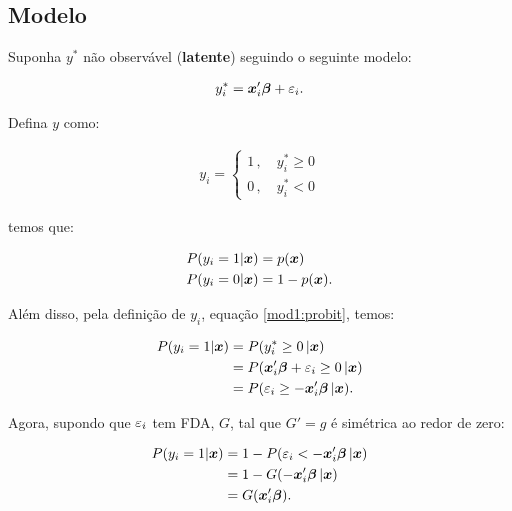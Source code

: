 \documentclass[11pt,oneside,a4paper]{article}
\numberwithin{equation}{section}
\begin{document}
\begin{description}
\begin{description}
\subsection*{Modelo}

Suponha $y^{*}$ não observável (\textbf{latente}) seguindo o seguinte modelo:

\vspace{-1 em}
\begin{align} \label{mod1:probit}
	y_{i}^{*} = \boldsymbol{x}_{i}' \boldsymbol{\beta} + \varepsilon_{i}.
\end{align}

\noindent
Defina $y$ como:

\vspace{-1 em}
\begin{align*}
y_{i} =
\begin{cases}
	1 \, , \quad y^{*}_{i} \geq 0
\\
	0 \, , \quad y^{*}_{i} < 0
\end{cases}
\end{align*}

\noindent
temos que:

\vspace{-1 em}
\begin{align*}
	P( y_{i} = 1 | \boldsymbol{x} ) &= p( \boldsymbol{x} )
	\\
	P( y_{i} = 0 | \boldsymbol{x} ) &= 1 - p( \boldsymbol{x} ).
\end{align*}

Além disso, pela definição de $y_{i}$, equação \eqref{mod1:probit}, temos:

\vspace{-1 em}
\begin{align*}
	P( y_{i} = 1 | \boldsymbol{x} ) &= P(y_{i}^{*} \geq 0 \, | \boldsymbol{x} )
\\
&= P( \boldsymbol{x}_{i}' \boldsymbol{\beta} + \varepsilon_{i} \geq 0 \, | \boldsymbol{x} )
\\
&= P( \varepsilon_{i} \geq - \boldsymbol{x}_{i}' \boldsymbol{\beta}  \, | \boldsymbol{x} ).
\end{align*}

\noindent
Agora, supondo que $\varepsilon_{i}$ tem FDA, $G$, tal que $G'=g$ é simétrica ao redor de zero:

\vspace{-1 em}
\begin{align*}
P( y_{i} = 1 | \boldsymbol{x} ) 
&= 1 - P( \varepsilon_{i} < - \boldsymbol{x}_{i}' \boldsymbol{\beta}  \, | \boldsymbol{x} )
\\
&= 1 - G( - \boldsymbol{x}_{i}' \boldsymbol{\beta}  \, | \boldsymbol{x} )
\\
&= G( \boldsymbol{x}_{i}' \boldsymbol{\beta} ).
\end{align*}


\end{description}
\end{description}
\end{document}
